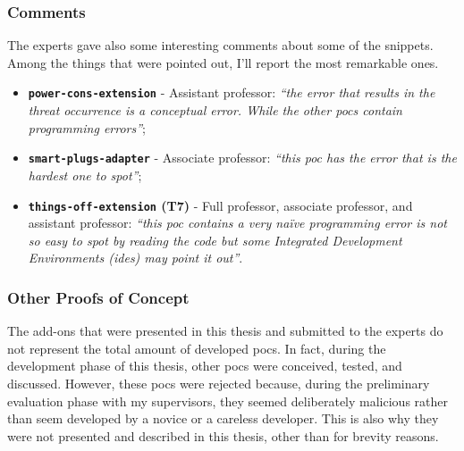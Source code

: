 \subsubsection{Comments}
The experts gave also some interesting comments about some of the snippets. Among the things that were pointed out, I'll report the most remarkable ones.

\begin{itemize}
    
    
    \item \textbf{\texttt{power-cons-extension}} - Assistant professor: \textit{``the error that results in the threat occurrence is a conceptual error. While the other \glspl{poc} contain programming errors''};

    \item \textbf{\texttt{smart-plugs-adapter}} - Associate professor: \textit{``this \gls{poc} has the error that is the hardest one to spot''};

    \item \textbf{\texttt{things-off-extension} (T7)} - Full professor, associate professor, and assistant professor: \textit{``this \gls{poc} contains a very na{\"i}ve programming error is not so easy to spot by reading the code but some Integrated Development Environments (\glspl{ide}) may point it out''}.

\end{itemize}

\subsubsection{Other Proofs of Concept}
The add-ons that were presented in this thesis and submitted to the experts do not represent the total amount of developed \glspl{poc}. In fact, during the development phase of this thesis, other \glspl{poc} were conceived, tested, and discussed. However, these \glspl{poc} were rejected because, during the preliminary evaluation phase with my supervisors, they seemed deliberately malicious rather than seem developed by a novice or a careless developer. This is also why they were not presented and described in this thesis, other than for brevity reasons.


